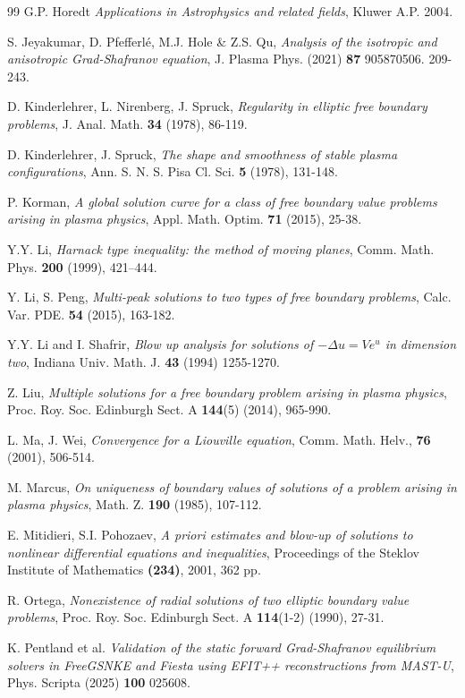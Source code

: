 \documentclass[10pt]{amsart}
\begin{document}
\begin{thebibliography}{99}
 G.P. Horedt {\sl Applications in Astrophysics and related fields}, Kluwer A.P. 2004.

 S. Jeyakumar, D. Pfefferl\'{e}, M.J. Hole \& Z.S. Qu,
{\it Analysis of the isotropic and anisotropic Grad-Shafranov equation}, J. Plasma Phys. (2021) {\bf 87} 905870506.
209-243.

 D. Kinderlehrer, L. Nirenberg, J. Spruck,
{\em Regularity in elliptic free boundary problems},
J. Anal. Math. {\bf 34} (1978), 86-119.

 D. Kinderlehrer, J. Spruck, {\em The shape and smoothness of stable plasma configurations},
Ann. S. N. S. Pisa Cl. Sci. {\bf 5} (1978), 131-148.

 P. Korman,
{\em A global solution curve for a class of free boundary value problems arising in plasma physics},
Appl. Math. Optim. {\bf 71} (2015), 25-38.

 Y.Y. Li,  {\em Harnack type inequality: the method of moving planes},
Comm. Math. Phys.  {\bf 200} (1999), 421--444.


Y. Li, S. Peng, {\em Multi-peak solutions to two types of free boundary problems},
Calc. Var. PDE. {\bf 54} (2015), 163-182.

Y.Y. Li and I. Shafrir, {\em Blow up analysis for solutions of $-\Delta u = V e^u$ in dimension two}, Indiana Univ. Math. J. {\bf 43} (1994) 1255-1270.

Z. Liu, {\em  Multiple solutions for a free boundary problem arising in plasma physics},
Proc. Roy. Soc. Edinburgh Sect. A {\bf 144}(5) (2014), 965-990.

 L. Ma, J. Wei,
{\em Convergence for a Liouville equation}, Comm. Math. Helv., {\bf 76} (2001), 506-514.

 M. Marcus, {\em On uniqueness of boundary values of solutions
of a problem arising in plasma physics}, Math. Z. {\bf 190} (1985), 107-112.

 E. Mitidieri, S.I. Pohozaev, {\sl A priori estimates and blow-up of solutions to nonlinear differential equations and inequalities},
Proceedings of the Steklov Institute of Mathematics {\bf (234)}, 2001, 362 pp.

 R. Ortega, {\em Nonexistence of radial solutions of two elliptic boundary
value problems}, Proc. Roy. Soc. Edinburgh Sect. A {\bf 114}(1-2) (1990), 27-31.

 K. Pentland et al.   {\em Validation of the static forward Grad-Shafranov equilibrium solvers in FreeGSNKE and Fiesta
using EFIT++ reconstructions from MAST-U}, Phys. Scripta (2025) {\bf 100} 025608.


\end{thebibliography}
\end{document}
